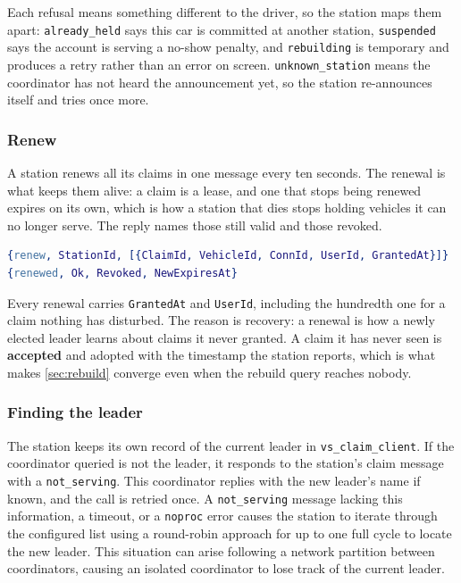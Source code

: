 Each refusal means something different to the driver, so the station maps them apart:
\texttt{already\_held} says this car is committed at another station,
\texttt{suspended} says the account is serving a no-show penalty, and
\texttt{rebuilding} is temporary and produces a retry rather than an error on screen.
\texttt{unknown\_station} means the coordinator has not heard the announcement yet, so the
station re-announces itself and tries once more.

\subsubsection{Renew}

A station renews all its claims in one message every ten seconds. The renewal is what keeps
them alive: a claim is a lease, and one that stops being renewed expires on its own, which
is how a station that dies stops holding vehicles it can no longer serve. The reply names
those still valid and those revoked.

\begin{lstlisting}[language=Erlang]
{renew, StationId, [{ClaimId, VehicleId, ConnId, UserId, GrantedAt}]}
{renewed, Ok, Revoked, NewExpiresAt}
\end{lstlisting}

Every renewal carries \texttt{GrantedAt} and \texttt{UserId}, including the hundredth one
for a claim nothing has disturbed. The reason is recovery: a renewal is how a newly elected
leader learns about claims it never granted. A claim it has never seen is \textbf{accepted} and adopted with the timestamp
the station reports, which is what makes \cref{sec:rebuild} converge even when the rebuild
query reaches nobody.

\subsubsection{Finding the leader}

The station keeps its own record of the current leader in \texttt{vs\_claim\_client}. If the coordinator queried is not the leader, it responds to the station's claim message with a \texttt{not\_serving}. This coordinator replies with the new leader's name if known, and the call is retried once. A \texttt{not\_serving} message lacking this information, a timeout, or a \texttt{noproc} error causes the station to iterate through the configured list using a round-robin approach for up to one full cycle to locate the new leader. This situation can arise following a network partition between coordinators, causing an isolated coordinator to lose track of the current leader.

